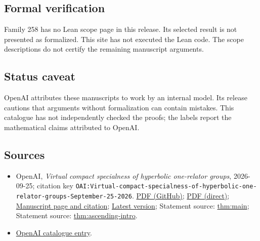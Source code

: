 \documentclass[11pt]{article}
\begin{document}
\subsection{Formal verification}
Family 258 has no Lean scope page in this release. Its selected result is not presented as formalized. This site has not executed the Lean code. The scope descriptions do not certify the remaining manuscript arguments.

\subsection{Status caveat}
OpenAI attributes these manuscripts to work by an internal model. Its release cautions that arguments without formalization can contain mistakes. This catalogue has not independently checked the proofs; the labels report the mathematical claims attributed to OpenAI.

\subsection{Sources}
\begin{itemize}
\item OpenAI, \emph{Virtual compact specialness of hyperbolic one-relator groups}, 2026-09-25; citation key \texttt{OAI:Virtual-compact-specialness-of-hyperbolic-one-relator-groups-September-25-2026}. \href{https://github.com/openai/math/blob/adc7f1241b42e322a6451854ab7e4b4c146bf78a/preprints/Virtual-compact-specialness-of-hyperbolic-one-relator-groups-September-25-2026/paper.pdf}{PDF (GitHub)}; \href{https://github.com/openai/math/raw/adc7f1241b42e322a6451854ab7e4b4c146bf78a/preprints/Virtual-compact-specialness-of-hyperbolic-one-relator-groups-September-25-2026/paper.pdf}{PDF (direct)}; \href{https://github.com/openai/math/blob/adc7f1241b42e322a6451854ab7e4b4c146bf78a/preprints/Virtual-compact-specialness-of-hyperbolic-one-relator-groups-September-25-2026/README.md}{Manuscript page and citation}; \href{https://github.com/openai/math/blob/main/preprints/Virtual-compact-specialness-of-hyperbolic-one-relator-groups-September-25-2026/paper.pdf}{Latest version}; Statement source: \href{https://github.com/openai/math/blob/adc7f1241b42e322a6451854ab7e4b4c146bf78a/preprints/Virtual-compact-specialness-of-hyperbolic-one-relator-groups-September-25-2026/build/source/sections/00-introduction.tex\#L5}{thm:main}; Statement source: \href{https://github.com/openai/math/blob/adc7f1241b42e322a6451854ab7e4b4c146bf78a/preprints/Virtual-compact-specialness-of-hyperbolic-one-relator-groups-September-25-2026/build/source/sections/00-introduction.tex\#L113}{thm:ascending-intro}.
\item \href{https://github.com/openai/math/blob/adc7f1241b42e322a6451854ab7e4b4c146bf78a/CONTENTS.md}{OpenAI catalogue entry}.
\end{itemize}
\end{document}
